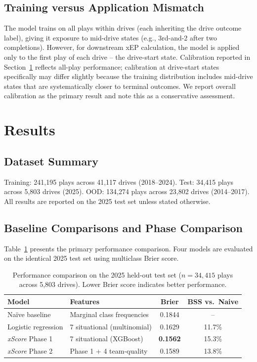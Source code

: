 \documentclass[12pt,a4paper]{article}
\newcommand{\xscore}{\textit{xScore}}
\begin{document}
\subsection{Training versus Application Mismatch}

The model trains on all plays within drives (each inheriting the drive outcome label), giving it exposure to mid-drive states (e.g., 3rd-and-2 after two completions). However, for downstream xEP calculation, the model is applied only to the first play of each drive -- the drive-start state. Calibration reported in Section~\ref{sec:results} reflects all-play performance; calibration at drive-start states specifically may differ slightly because the training distribution includes mid-drive states that are systematically closer to terminal outcomes. We report overall calibration as the primary result and note this as a conservative assessment.

\section{Results}
\label{sec:results}

\subsection{Dataset Summary}

Training: 241,195 plays across 41,117 drives (2018--2024). Test: 34,415 plays across 5,803 drives (2025). OOD: 134,274 plays across 23,802 drives (2014--2017). All results are reported on the 2025 test set unless stated otherwise.

\subsection{Baseline Comparisons and Phase Comparison}

Table~\ref{tab:model-comparison} presents the primary performance comparison. Four models are evaluated on the identical 2025 test set using multiclass Brier score.

\begin{table}[htbp]
  \centering
  \caption{Performance comparison on the 2025 held-out test set ($n = 34{,}415$ plays across 5,803 drives). Lower Brier score indicates better performance.}
  \label{tab:model-comparison}
  \small
  \begin{tabularx}{\textwidth}{lXcc}
    \toprule
    \textbf{Model} & \textbf{Features} & \textbf{Brier} & \textbf{BSS vs.\ Naive} \\
    \midrule
    Na\"ive baseline & Marginal class frequencies & 0.1844 &  -- \\
    Logistic regression & 7 situational (multinomial) & 0.1629 & 11.7\% \\
    \xscore{} Phase 1 & 7 situational (XGBoost) & \textbf{0.1562} & 15.3\% \\
    \xscore{} Phase 2 & Phase 1 + 4 team-quality & 0.1589 & 13.8\% \\
    \bottomrule
  \end{tabularx}
\end{table}
\end{document}
